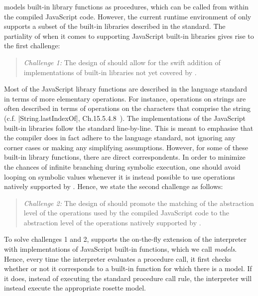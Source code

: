 \JSComp models built-in library functions as \jsil procedures, which can be called from within the
 compiled JavaScript code. However, the current runtime environment of \JSComp only supports a subset 
of the built-in libraries described in the standard. 
The partiality of \JSComp when it comes to supporting JavaScript built-in libraries 
gives rise to the first challenge:  
\begin{quote}
\emph{Challenge 1:} The design of \jilette should allow for the swift addition of  
implementations of built-in libraries not yet covered by \JSComp.  
\end{quote}

Most of the JavaScript library functions are described in the language standard in terms of 
more elementary operations. For instance, operations on strings are often described in terms 
of operations on the characters that comprise the string (c.f. \jsinline|String.lastIndexOf|, Ch.15.5.4.8~\cite{ecma}). 
The \jsil implementations of the JavaScript built-in libraries follow the standard line-by-line. 
This is meant to emphasise that the compiler does in fact adhere to the language standard, 
not ignoring any corner cases or making any simplifying assumptions. 
However, for some of these built-in library functions, there are direct \rosette correspondents. 
%
In order to minimize the chances of infinite branching during symbolic execution, one 
should avoid looping on symbolic values whenever it is instead possible to use operations 
natively supported by \rosette. Hence, we state the second challenge as follows: 
\begin{quote}
\emph{Challenge 2:} The design of \jilette should promote the matching of the 
abstraction level of the \rosette operations used by the compiled JavaScript code to 
the abstraction level of the operations natively supported by \rosette.  
\end{quote}

To solve challenges 1 and 2, \jilette supports the on-the-fly extension of the \jsil interpreter 
with \rosette implementations of JavaScript built-in functions, which we call \rosette \emph{models}. 
Hence, every time the interpreter evaluates a procedure call, it first checks whether or 
not it corresponds to a built-in function for which there is a \rosette model. If it does, 
instead of executing the standard procedure call rule, the interpreter will instead 
execute the appropriate rosette model. 

